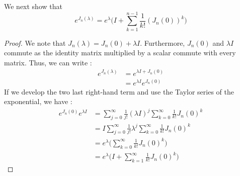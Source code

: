 \documentclass[11pt]{article}
\begin{document}
We next show that
\begin{equation*}
    e^{J_n(\lambda)}=e^{\lambda}\Bigg(I+\sum_{k=1}^{n-1}\frac{1}{k!}(J_n(0))^k\Bigg)
\end{equation*}
\begin{proof}
We note that $J_n(\lambda)=J_n(0)+\lambda I$. Furthermore, $J_n(0)$ and $\lambda I$ commute as the identity matrix multiplied by a scalar commute with every matrix. Thus, we can write :
\begin{align*}
    e^{J_n(\lambda)}&=e^{\lambda I+J_n(0)}\\
    &=e^{\lambda I}e^{J_n(0)}
\end{align*}
If we develop the two last right-hand term and use the Taylor series of the exponential, we have :
\begin{align*}
    e^{J_n(0)}e^{\lambda I}&=\sum_{j=0}^{\infty}\frac{1}{j!}(\lambda I)^j\sum_{k=0}^{\infty}\frac{1}{k!}J_n(0)^k\\
    &=I\sum_{j=0}^{\infty}\frac{1}{j!}\lambda ^j\sum_{k=0}^{\infty}\frac{1}{k!}J_n(0)^k\\
    &=e^{\lambda}\Bigg(\sum_{k=0}^{\infty}\frac{1}{k!}J_n(0)^k\Bigg)\\
    &=e^{\lambda}\Bigg(I+\sum_{k=1}^{\infty}\frac{1}{k!}J_n(0)^k\Bigg)
\end{align*}
\end{proof}
\end{document}
